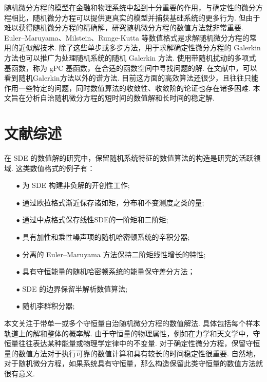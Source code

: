 随机微分方程的模型在金融和物理系统中起到十分重要的作用，与确定性的微分方程相比，随机微分方程可以提供更真实的模型并捕获基础系统的更多行为. 但由于难以获得随机微分方程的精确解，研究随机微分方程的数值方法就非常重要. Euler–Maruyama、Milstein、Runge-Kutta 等数值格式是求解随机微分方程的常用的近似解技术. 除了这些单步或多步方法，用于求解确定性微分方程的 Galerkin 方法也可以推广为处理随机系统的随机 Galerkin 方法. 使用带随机扰动的多项式基函数，称为 gPC 基函数，在合适的函数空间中寻找问题的解. 在文献\cite{book_buqueding}中，可以看到随机Galerkin方法以外的谱方法. 目前这方面的高效算法还很少，且往往只能作用一些特定的问题，同时数值算法的收敛性、收敛阶的论证也存在诸多困难. 本文旨在分析自治随机微分方程的短时间的数值解和长时间的稳定解. 












\section{文献综述}

在 SDE 的数值解的研究中，保留随机系统特征的数值算法的构造是研究的活跃领域. 
这类数值格式的例子有：
\begin{enumerate}
	\item[$\bullet$] 为 SDE 构建非负解的开创性工作\cite{zongshu5};
	\item[$\bullet$] 通过欧拉格式渐近保存诸如矩，分布和不变测度之类的量\cite{zongshu6}; 
	\item[$\bullet$] 通过中点格式保存线性SDE的一阶矩和二阶矩\cite{zongshu7};
	\item[$\bullet$] 具有加性和乘性噪声项的随机哈密顿系统的辛积分器\cite{zongshu16,zongshu17};
	\item[$\bullet$] 分离的 Euler–Maruyama 方法保持二阶矩线性增长的特性\cite{zongshu14};
	\item[$\bullet$] 具有守恒能量的随机哈密顿系统的能量保守差分方法\cite{zongshu18}；
	\item[$\bullet$] SDE 的边界保留半解析数值算法\cite{zongshu21};
	\item[$\bullet$] 随机李群积分器\cite{zongshu12};
\end{enumerate}

本文关注于带单一或多个守恒量自治随机微分方程的数值解法. 具体包括每个样本轨道上的解和整体的概率解. 
由于守恒量的物理属性，例如在力学和天文学中，守恒量往往表达某种能量或物理学定律中的不变量. 对于确定性微分方程，保留守恒量的数值方法对于执行可靠的数值计算和具有较长的时间稳定性很重要\cite{zongshu4}. 
自然地，对于随机微分方程，如果系统具有守恒量，那么构造保留此类守恒量的数值方法就很有意义. 

